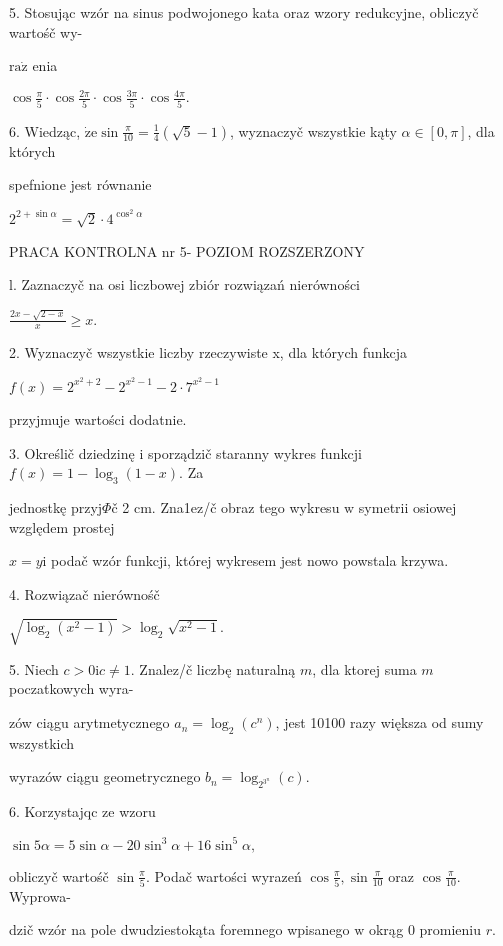 \documentclass[a4paper,12pt]{article}
\begin{document}
5. Stosując wzór na sinus podwojonego kata oraz wzory redukcyjne, obliczyč wartośč wy-

$\mathrm{r}\mathrm{a}\dot{\mathrm{z}}$ enia

$\displaystyle \cos\frac{\pi}{5}\cdot\cos\frac{2\pi}{5}\cdot\cos\frac{3\pi}{5}\cdot\cos\frac{4\pi}{5}.$

6. Wiedząc, $\dot{\mathrm{z}}\mathrm{e} \displaystyle \sin\frac{\pi}{10} = \displaystyle \frac{1}{4}(\sqrt{5}-1)$, wyznaczyč wszystkie kąty $\alpha \in [0,\pi]$, dla których

spefnione jest równanie

$2^{2+\sin\alpha}=\sqrt{2}\cdot 4^{\cos^{2}\alpha}$





PRACA KONTROLNA nr 5- POZIOM ROZSZERZONY

l. Zaznaczyč na osi liczbowej zbiór rozwiązań nierówności

$\displaystyle \frac{2x-\sqrt{2-x}}{x}\geq x.$

2. Wyznaczyč wszystkie liczby rzeczywiste x, dla których funkcja

$f(x)=2^{x^{2}+2}-2^{x^{2}-1}-2\cdot 7^{x^{2}-1}$

przyjmuje wartości dodatnie.

3. Określič dziedzinę $\mathrm{i}$ sporządzič staranny wykres funkcji $f(x) = 1-\log_{3}(1-x)$. Za

jednostkę przyj$\Phi$č 2 cm. Zna1ez/č obraz tego wykresu $\mathrm{w}$ symetrii osiowej względem prostej

$x=y\mathrm{i}$ podač wzór funkcji, której wykresem jest nowo powstala krzywa.

4. Rozwiązač nierównośč

$\sqrt{\log_{2}(x^{2}-1)}>\log_{2}\sqrt{x^{2}-1}.$

5. Niech $c>0\mathrm{i}c\neq 1$. Znalez/č liczbę naturalną $m$, dla ktorej suma $m$ poczatkowych wyra-

zów ciągu arytmetycznego $a_{n}=\log_{2}(c^{n})$, jest 10100 razy większa od sumy wszystkich

wyrazów ciągu geometrycznego $b_{n}=\log_{2^{3^{n}}}(c).$

6. Korzystajqc ze wzoru

$\sin 5\alpha=5\sin\alpha-20\sin^{3}\alpha+16\sin^{5}\alpha,$

obliczyč wartośč $\displaystyle \sin\frac{\pi}{5}$. Podač wartości wyrazeń $\displaystyle \cos\frac{\pi}{5}, \displaystyle \sin\frac{\pi}{10}$ oraz $\displaystyle \cos\frac{\pi}{10}$. Wyprowa-

dzič wzór na pole dwudziestokąta foremnego wpisanego $\mathrm{w}$ okrąg $0$ promieniu $r.$
\end{document}
